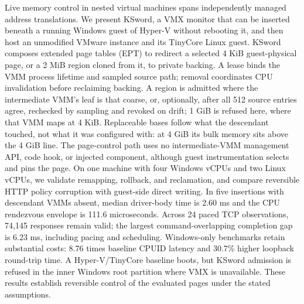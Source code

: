 Live memory control in nested virtual machines spans independently managed address translations. We present KSword, a VMX monitor that can be inserted beneath a running Windows guest of Hyper-V without rebooting it, and then host an unmodified VMware instance and its TinyCore Linux guest. KSword composes extended page tables (EPT) to redirect a selected 4 KiB guest-physical page, or a 2 MiB region cloned from it, to private backing. A lease binds the VMM process lifetime and sampled source path; removal coordinates CPU invalidation before reclaiming backing. A region is admitted where the intermediate VMM's leaf is that coarse, or, optionally, after all 512 source entries agree, rechecked by sampling and revoked on drift; 1 GiB is refused here, where that VMM maps at 4 KiB. Replaceable bases follow what the descendant touched, not what it was configured with: at 4 GiB its bulk memory sits above the 4 GiB line. The page-control path uses no intermediate-VMM management API, code hook, or injected component, although guest instrumentation selects and pins the page. On one machine with four Windows vCPUs and two Linux vCPUs, we validate remapping, rollback, and reclamation, and compare reversible HTTP policy corruption with guest-side direct writing. In five insertions with descendant VMMs absent, median driver-body time is 2.60 ms and the CPU rendezvous envelope is 111.6 microseconds. Across 24 paced TCP observations, 74,145 responses remain valid; the largest command-overlapping completion gap is 6.23 ms, including pacing and scheduling. Windows-only benchmarks retain substantial costs: 8.76 times baseline CPUID latency and 30.7\% higher loopback round-trip time. A Hyper-V/TinyCore baseline boots, but KSword admission is refused in the inner Windows root partition where VMX is unavailable. These results establish reversible control of the evaluated pages under the stated assumptions.
